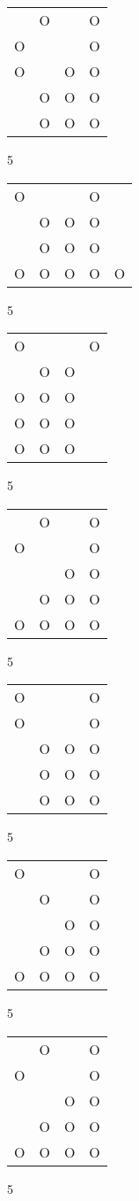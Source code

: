 \begin{tabular}{|m{0.2cm}m{0.2cm}m{0.2cm}m{0.2cm}|}\hline
 &O& &O\\
O& & &O\\
O& &O&O\\
 &O&O&O\\
 &O&O&O\\
\hline\end{tabular}5
\begin{tabular}{|m{0.2cm}m{0.2cm}m{0.2cm}m{0.2cm}m{0.2cm}|}\hline
O& & &O& \\
 &O&O&O& \\
 &O&O&O& \\
O&O&O&O&O\\
\hline\end{tabular}5
\begin{tabular}{|m{0.2cm}m{0.2cm}m{0.2cm}m{0.2cm}|}\hline
O& & &O\\
 &O&O& \\
O&O&O& \\
O&O&O& \\
O&O&O& \\
\hline\end{tabular}5
\begin{tabular}{|m{0.2cm}m{0.2cm}m{0.2cm}m{0.2cm}|}\hline
 &O& &O\\
O& & &O\\
 & &O&O\\
 &O&O&O\\
O&O&O&O\\
\hline\end{tabular}5
\begin{tabular}{|m{0.2cm}m{0.2cm}m{0.2cm}m{0.2cm}|}\hline
O& & &O\\
O& & &O\\
 &O&O&O\\
 &O&O&O\\
 &O&O&O\\
\hline\end{tabular}5
\begin{tabular}{|m{0.2cm}m{0.2cm}m{0.2cm}m{0.2cm}|}\hline
O& & &O\\
 &O& &O\\
 & &O&O\\
 &O&O&O\\
O&O&O&O\\
\hline\end{tabular}5
\begin{tabular}{|m{0.2cm}m{0.2cm}m{0.2cm}m{0.2cm}|}\hline
 &O& &O\\
O& & &O\\
 & &O&O\\
 &O&O&O\\
O&O&O&O\\
\hline\end{tabular}5

